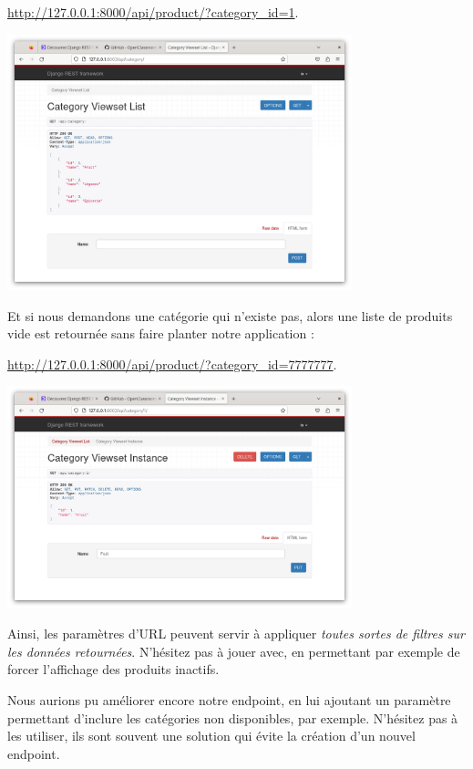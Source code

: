 \documentclass[a4paper]{article}
\begin{document}
\begin{center}
\url{http://127.0.0.1:8000/api/product/?category_id=1}.
\end{center}
\begin{center}
\includegraphics[width=10cm]{images/image09.png}
\end{center}
Et si nous demandons une catégorie qui n'existe pas, alors une liste de produits vide est retournée sans faire planter notre application :
\begin{center}
\url{http://127.0.0.1:8000/api/product/?category_id=7777777}.
\end{center}
\begin{center}
\includegraphics[width=10cm]{images/image10.png}
\end{center}

Ainsi, les paramètres d’URL peuvent servir à appliquer {\em toutes sortes de filtres sur les données retournées}. N’hésitez pas à jouer avec, en permettant par exemple de forcer l’affichage des produits inactifs.
\begin{theorem}
Nous aurions pu améliorer encore notre endpoint, en lui ajoutant un paramètre permettant d’inclure les catégories non disponibles, par exemple. N’hésitez pas à les utiliser, ils sont souvent une solution qui évite la création d’un nouvel endpoint.
\end{theorem}
\end{document}
